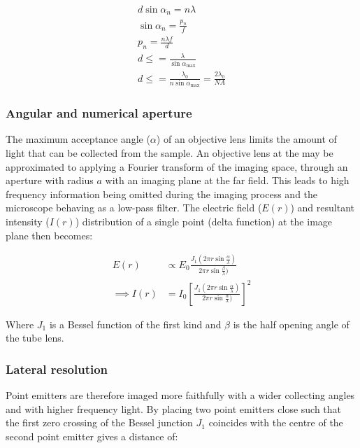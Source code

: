%

\begin{align}
    d \sin \alpha_n = n \lambda \\
    \sin\alpha_n = \frac{p_n}{f} \\
    p_n = \frac{n\lambda f}{d} \\
    d \le = \frac{\lambda}{\sin\alpha_{\text{max}}} \\
    d \le = \frac{\lambda_0}{n\sin\alpha_{\text{max}}} = \frac{2\lambda_0}{NA}
\end{align}

\subsubsection{Angular and numerical aperture}

The maximum acceptance angle ($\alpha$) of an objective lens limits the amount of light that can be collected from the sample.
An objective lens at the may be approximated to applying a Fourier transform of the imaging space, through an aperture with radius $a$ with an imaging plane at the far field.
This leads to high frequency information being omitted during the imaging process and the microscope behaving as a low-pass filter.
The electric field ($E(r)$) and resultant intensity ($I(r)$) distribution of a single point (delta function) at the image plane then becomes:

\begin{align}
    E(r) &\propto E_0 \frac{J_1 \left(2\pi r \sin \frac{\alpha}{\lambda}\right)}{2\pi r \sin \frac{\beta}{\lambda})}\\
    \implies
    I(r) &= I_0 \left[\frac{J_1 \left(2\pi r \sin \frac{\alpha}{\lambda}\right)}{2\pi r \sin \frac{\alpha}{\lambda})}\right]^2
\end{align}

Where $J_1$ is a Bessel function of the first kind and $\beta$ is the half opening angle of the tube lens.

\subsubsection{Lateral resolution}

Point emitters are therefore imaged more faithfully with a wider collecting angles and with higher frequency light.
By placing two point emitters close such that the first zero crossing of the Bessel junction $J_1$ coincides with the centre of the second point emitter gives a distance of:

